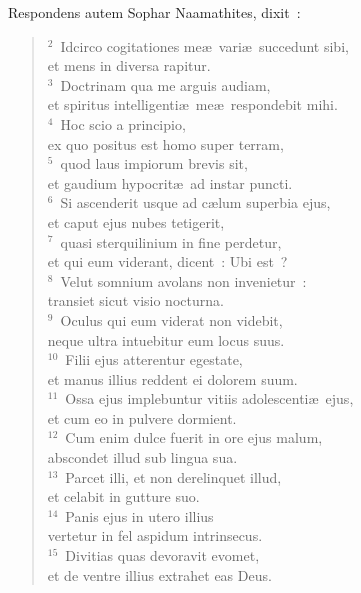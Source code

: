 \lettrine[lines=3,image=true,loversize=0.05,lraise=-0.03]{R}{}espondens autem Sophar Naamathites, dixit~:
\begin{flushleft}\begin{verse}\vspace{6pt}${}^{2}$~Idcirco cogitationes me\ae\ vari\ae\ succedunt sibi,\\ et mens in diversa rapitur.\\
${}^{3}$~Doctrinam qua me arguis audiam,\\ et spiritus intelligenti\ae\ me\ae\ respondebit mihi.\\
${}^{4}$~Hoc scio a principio,\\ ex quo positus est homo super terram,\\
${}^{5}$~quod laus impiorum brevis sit,\\ et gaudium hypocrit\ae\ ad instar puncti.\\
${}^{6}$~Si ascenderit usque ad c\ae lum superbia ejus,\\ et caput ejus nubes tetigerit,\\
${}^{7}$~quasi sterquilinium in fine perdetur,\\ et qui eum viderant, dicent~: Ubi est~?\\
${}^{8}$~Velut somnium avolans non invenietur~:\\ transiet sicut visio nocturna.\\
${}^{9}$~Oculus qui eum viderat non videbit,\\ neque ultra intuebitur eum locus suus.\\
${}^{10}$~Filii ejus atterentur egestate,\\ et manus illius reddent ei dolorem suum.\\
${}^{11}$~Ossa ejus implebuntur vitiis adolescenti\ae\ ejus,\\ et cum eo in pulvere dormient.\\
${}^{12}$~Cum enim dulce fuerit in ore ejus malum,\\ abscondet illud sub lingua sua.\\
${}^{13}$~Parcet illi, et non derelinquet illud,\\ et celabit in gutture suo.\\
${}^{14}$~Panis ejus in utero illius\\ vertetur in fel aspidum intrinsecus.\\
${}^{15}$~Divitias quas devoravit evomet,\\ et de ventre illius extrahet eas Deus.\\

\end{verse}
\end{flushleft}
